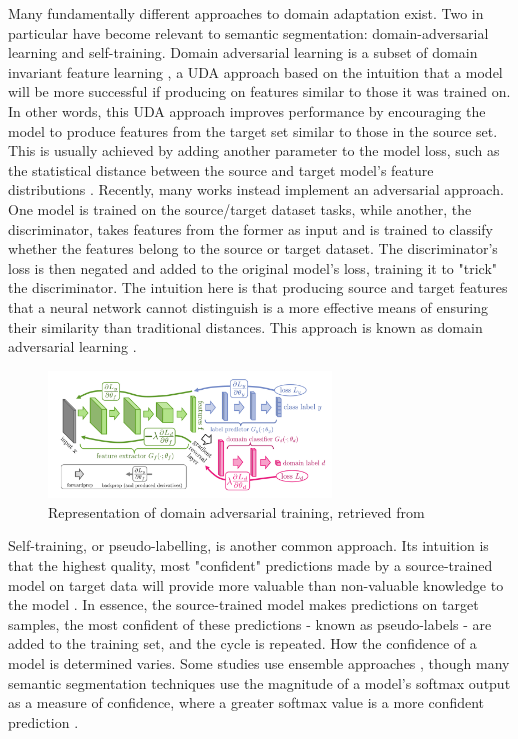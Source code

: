 \documentclass[a4paper,12pt]{report}
\begin{document}
Many fundamentally different approaches to domain adaptation exist. Two in particular have become relevant to semantic segmentation: domain-adversarial learning and self-training. Domain adversarial learning is a subset of domain invariant feature learning \cite{wilson_survey_2020}, a UDA approach based on the intuition that a model will be more successful if producing on features similar to those it was trained on. In other words, this UDA approach improves performance by encouraging the model to produce features from the target set similar to those in the source set. This is usually achieved by adding another parameter to the model loss, such as the statistical distance between the source and target model's feature distributions \cite{gretton_kernel_2006} \cite{sun_return_2015}. Recently, many works \cite{ganin_unsupervised_2015} \cite{ganin_domain-adversarial_2016} instead implement an adversarial \cite{goodfellow_generative_2014} approach. One model is trained on the source/target dataset tasks, while another, the discriminator, takes features from the former as input and is trained to classify whether the features belong to the source or target dataset. The discriminator's loss is then negated and added to the original model's loss, training it to "trick" the discriminator. The intuition here is that producing source and target features that a neural network cannot distinguish is a more effective means of ensuring their similarity than traditional distances. This approach is known as domain adversarial learning \cite{ganin_domain-adversarial_2016}.

\begin{figure}[h]
    \centering
    \includegraphics[width=0.67\textwidth]{res/domain-adversarial-training.png}
    \caption{Representation of domain adversarial training, retrieved from
        \cite{ganin_domain-adversarial_2016}}
    \label{fig:domain-adversarial-training}
\end{figure}

Self-training, or pseudo-labelling, is another common approach. Its intuition is that the highest quality, most "confident" predictions made by a source-trained model on target data will provide more valuable than non-valuable knowledge to the model \cite{wilson_survey_2020} \cite{kamnitsas_transductive_2021}. In essence, the source-trained model makes predictions on target samples, the most confident of these predictions - known as pseudo-labels - are added to the training set, and the cycle is repeated. How the confidence of a model is determined varies. Some studies use ensemble approaches \cite{kamnitsas_transductive_2021}, though many semantic segmentation techniques use the magnitude of a model's softmax output as a measure of confidence, where a greater softmax value is a more confident prediction \cite{zou_domain_2018}.
\end{document}
